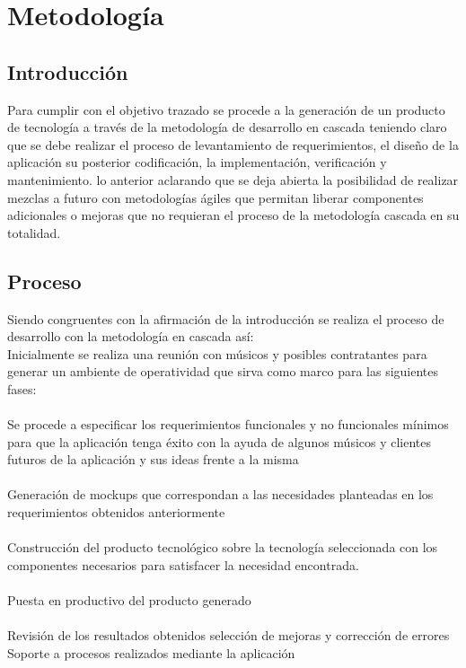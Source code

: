 \chapter{Metodología}

\section{Introducción}
Para cumplir con el objetivo trazado se procede a la generación de un producto de tecnología a través de la metodología de desarrollo en cascada teniendo claro que se debe realizar el proceso de levantamiento de requerimientos, el diseño de la aplicación su posterior codificación, la implementación, verificación y mantenimiento. lo anterior aclarando que se deja abierta la posibilidad de realizar mezclas a futuro con metodologías ágiles que permitan liberar componentes adicionales o mejoras que no requieran el proceso de la metodología cascada en su totalidad.

\section{Proceso}

Siendo congruentes con la afirmación de la introducción se realiza el proceso de desarrollo con la metodología en cascada así:
\\
Inicialmente se realiza una reunión con músicos y posibles contratantes para generar un ambiente de operatividad que sirva como marco para las siguientes fases:\\
\\
Se procede a especificar los requerimientos funcionales y no funcionales mínimos para que la aplicación tenga éxito con la ayuda de algunos músicos y clientes futuros de la aplicación y sus ideas frente a la misma\\
\\
Generación de mockups que correspondan a las necesidades planteadas en los requerimientos obtenidos anteriormente\\
\\
Construcción del producto tecnológico sobre la tecnología seleccionada con los componentes necesarios para satisfacer la necesidad encontrada.\\
 \\
Puesta en productivo del producto generado\\
\\
Revisión de los resultados obtenidos selección de mejoras y corrección de errores
\\
Soporte a procesos realizados mediante la aplicación